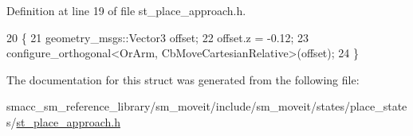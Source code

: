 Definition at line 19 of file st\+\_\+place\+\_\+approach.\+h.


\begin{DoxyCode}
20     \{
21         geometry\_msgs::Vector3 offset;
22         offset.z = -0.12;
23         configure\_orthogonal<OrArm, CbMoveCartesianRelative>(offset);
24     \}
\end{DoxyCode}


The documentation for this struct was generated from the following file\+:\begin{DoxyCompactItemize}
\item 
smacc\+\_\+sm\+\_\+reference\+\_\+library/sm\+\_\+moveit/include/sm\+\_\+moveit/states/place\+\_\+states/\hyperlink{include_2sm__moveit_2states_2place__states_2st__place__approach_8h}{st\+\_\+place\+\_\+approach.\+h}\end{DoxyCompactItemize}
